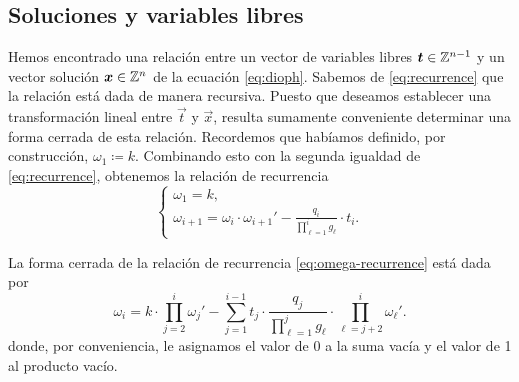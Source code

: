 \subsection{Soluciones y variables libres}
\label{subsec:linear}
\noindent
Hemos encontrado una relación entre un vector de variables libres $\boldsymbol{t} \in \mathbb{Z}^{n-1}$
y un vector solución $\boldsymbol{x} \in \mathbb{Z}^n$ de la ecuación \eqref{eq:dioph}. Sabemos de
\eqref{eq:recurrence} que la relación está dada de manera recursiva. Puesto que deseamos establecer
una transformación lineal entre $\vec{t}$ y $\vec{x}$, resulta sumamente conveniente determinar una
forma cerrada de esta relación. Recordemos que habíamos definido, por construcción, $\omega_1
\coloneq k$. Combinando esto con la segunda igualdad de \eqref{eq:recurrence}, obtenemos la relación
de recurrencia
\begin{equation}
	\label{eq:omega-recurrence}
	\begin{cases}
		\omega_1 = k, \\
		\omega_{i + 1} = \omega_i \cdot \omega_{i + 1}' - \frac{q_i}{\prod_{\ell=1}^{i}g_\ell} \cdot t_i.
	\end{cases}
\end{equation}
\begin{lemma}
	La forma cerrada de la relación de recurrencia \eqref{eq:omega-recurrence} está dada por
	\begin{equation}
		\label{eq:omega-formula}
		\omega_i =
		k \cdot \prod_{j=2}^{i} \omega_j'
		- \sum_{j=1}^{i - 1}
		t_j \cdot
		\frac{q_j}{\prod_{\ell=1}^{j}g_\ell}
		\cdot \prod_{\ell=j+2}^{i}\omega_\ell'.
	\end{equation}
	donde, por conveniencia, le asignamos el valor de 0 a la suma vacía y el valor de 1 al producto
	vacío.
\end{lemma}
